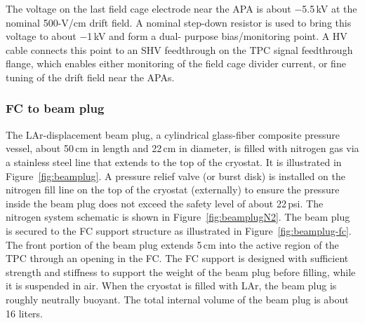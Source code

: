 The voltage on the last field cage electrode near the APA is about $-$5.5\,kV at the nominal 500-V/cm drift field. A nominal step-down resistor is used to bring this voltage to about $-$1\,kV and form a dual-
purpose bias/monitoring point.  A HV cable connects this point to an SHV feedthrough on the TPC signal feedthrough flange, which enables either monitoring of the field cage divider current, or fine tuning of the drift field near the APAs.  

\subsubsection{FC to beam plug}
\label{subsec:fc-beamplug}




The LAr-displacement beam plug, a cylindrical glass-fiber composite pressure vessel, about 50\,cm in length and 22\,cm in diameter, is filled with nitrogen gas via a stainless steel line that extends to the top of the cryostat. It is illustrated in Figure~\ref{fig:beamplug}.
A pressure relief valve (or burst disk) is installed on the nitrogen fill line on the top of the cryostat (externally) to ensure the pressure inside the beam plug does not exceed the safety level of about 22\,psi. The nitrogen system schematic is shown in Figure~\ref{fig:beamplugN2}. 
The beam plug is secured to the FC support structure as illustrated in Figure~\ref{fig:beamplug-fc}. The front portion of the beam plug extends  5\,cm into the active region of the TPC  through an opening in the FC. The FC support is designed with sufficient strength and stiffness to support the weight of the beam plug before filling, while it is suspended in air.  When the cryostat is filled with LAr, the beam plug is roughly neutrally buoyant.  The total internal volume of the beam plug is about 16 liters. 

